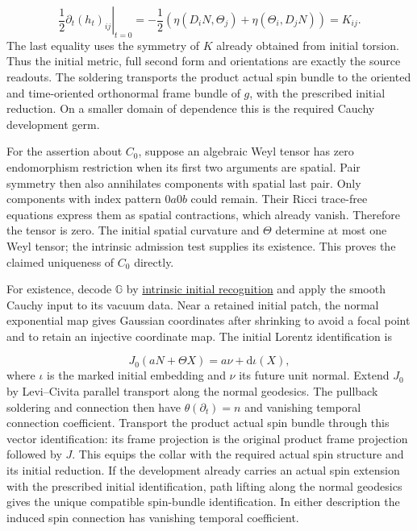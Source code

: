 \documentclass[
  english,
  11pt,
  reqno]{amsart}
\begin{document}
\label{eq:online-cartan-initial-second-form} \[
\left.\frac12\partial_t(h_t)_{ij}\right|_{t=0}
=-\frac12\left(
\eta(D_iN,\Theta_j)+\eta(\Theta_i,D_jN)
\right)
=K_{ij}.
\] The last equality uses the symmetry of \(K\) already obtained from
initial torsion. Thus the initial metric, full second form and
orientations are exactly the source readouts. The soldering transports
the product actual spin bundle to the oriented and time-oriented
orthonormal frame bundle of \(g\), with the prescribed initial
reduction. On a smaller domain of dependence this is the required Cauchy
development germ.

For the assertion about \(C_0\), suppose an algebraic Weyl tensor has
zero endomorphism restriction when its first two arguments are spatial.
Pair symmetry then also annihilates components with spatial last pair.
Only components with index pattern \(0a0b\) could remain. Their Ricci
trace-free equations express them as spatial contractions, which already
vanish. Therefore the tensor is zero. The initial spatial curvature and
\(\Theta\) determine at most one Weyl tensor; the intrinsic admission
test supplies its existence. This proves the claimed uniqueness of
\(C_0\) directly.

For existence, decode \(\mathbb G\) by
\hyperref[thm:online-intrinsic-gradient-vacuum-recognition]{intrinsic
initial recognition} and apply the smooth Cauchy input to its vacuum
data. Near a retained initial patch, the normal exponential map gives
Gaussian coordinates after shrinking to avoid a focal point and to
retain an injective coordinate map. The initial Lorentz identification
is

\label{eq:online-cartan-initial-geometric-identification}
\[
J_0(aN+\Theta X)=a\nu+\mathrm d\iota(X),
\] where \(\iota\) is the marked initial embedding and \(\nu\) its
future unit normal. Extend \(J_0\) by Levi--Civita parallel transport
along the normal geodesics. The pullback soldering and connection then
have \(\theta(\partial_t)=n\) and vanishing temporal connection
coefficient. Transport the product actual spin bundle through this
vector identification: its frame projection is the original product
frame projection followed by \(J\). This equips the collar with the
required actual spin structure and its initial reduction. If the
development already carries an actual spin extension with the prescribed
initial identification, path lifting along the normal geodesics gives
the unique compatible spin-bundle identification. In either description
the induced spin connection has vanishing temporal coefficient.
\end{document}
